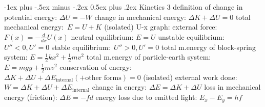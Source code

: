 \documentclass[10pt,landscape]{article}
\makeatletter
\renewcommand{\subsection}{\@startsection{subsection}{2}{0mm}%
                                {-1ex plus -.5ex minus -.2ex}%
                                {0.5ex plus .2ex}%
                                {\normalfont\normalsize\bfseries}}
\makeatother
\begin{document}
\begin{multicols*}{3}
\subsection{Kinetics 3}
definition of change in potential energy: $\Delta U=-W$
\newline
change in mechanical energy: $\Delta K+\Delta U=0$
\newline
total mechanical energy: $E=U+K$ (isolated)
\newline \newline
U-x graph:
\newline
external force: $F(x)=-\frac{d}{dx}U(x)$
\newline
neutral equilibrium: $E=U$
\newline
unstable equilibrium: $U''< 0, U'=0$
\newline
stable equilibrium: $U''> 0, U'=0$
\newline \newline
total m.energy of block-spring system: $E=\frac{1}{2}kx^2+\frac{1}{2}mv^2$
\newline
total m.energy of particle-earth system: $E=mgy+\frac{1}{2}mv^2$
\newline
conservation of energy: $\Delta K+\Delta U+\Delta E_{\textrm{internal}}\left ( + \textrm{other forms} \right )=0$ (isolated)
\newline
external work done: $W=\Delta K+\Delta U+\Delta E_{\textrm{internal}}$
\newline
change in energy: $\Delta E=\Delta K+\Delta U$
\newline
loss in mechanical energy (friction): $\Delta E=-fd$
\newline
energy loss due to emitted light: $E_x-E_y=hf$


\end{multicols*}
\end{document}
